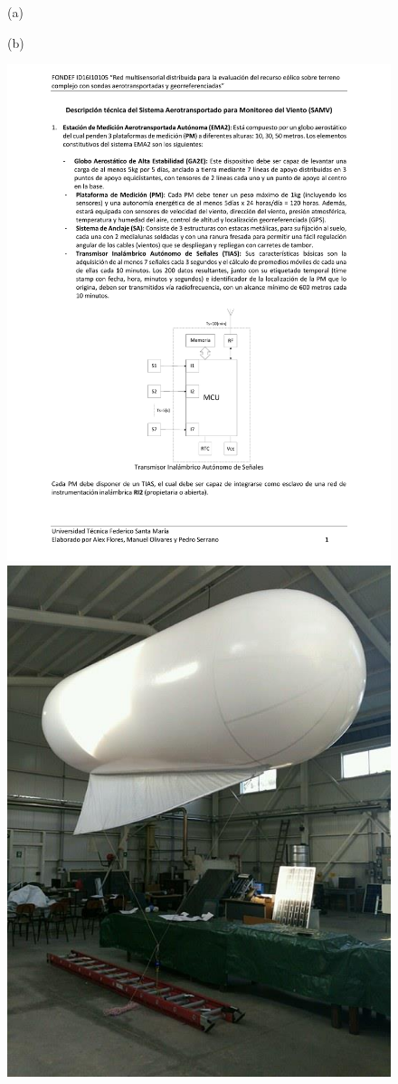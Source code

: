\begin{figure}
	\begin{minipage}{0.5\linewidth}
		\centering
		(a)
	\end{minipage}
	\begin{minipage}{0.5\linewidth}
		\centering
		(b)
	\end{minipage}
	
	\begin{minipage}{0.5\linewidth}
		\centering
		\includegraphics[width=0.9\linewidth,page=3,trim={6cm 12.2cm 6cm 9.5cm},clip]{Imagenes/01/descrp}
	\end{minipage}
	\begin{minipage}{0.5\linewidth}
		\centering
		\includegraphics[width=0.7\linewidth,trim={0cm 0cm 0cm 0cm},clip]{Imagenes/01/prototipo}

\end{minipage}
\end{figure}

